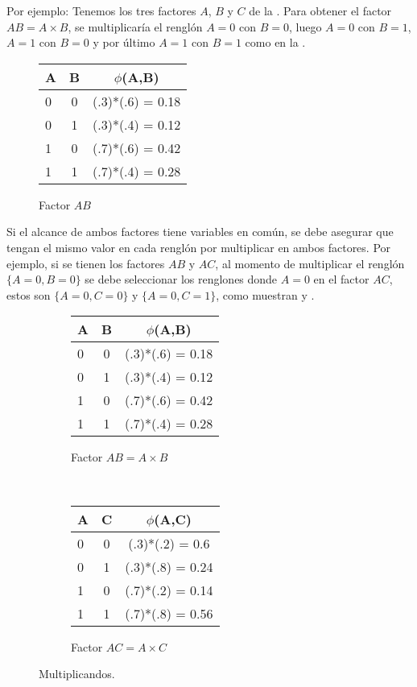 Por ejemplo: Tenemos los tres factores $A$, $B$ y $C$ de la . Para obtener el factor $AB = A \times B$, se multiplicaría el renglón $A=0$ con $B=0$, luego $A=0$ con $B=1$, $A=1$ con $B=0$ y por último $A=1$ con $B=1$ como en la .

\begin{figure}[H]
  \begin{center}
    \begin{tabular}{ l  c | c }
      A & B & $\phi$(A,B)\\ \hline
      0 & 0 & (.3)*(.6) = 0.18 \\ \hline
      0 & 1 & (.3)*(.4) = 0.12 \\ \hline
      1 & 0 & (.7)*(.6) = 0.42 \\ \hline
      1 & 1 & (.7)*(.4) = 0.28 \\
    \end{tabular}
  \end{center}
  \caption{Factor $AB$}
  \label{fig:FactorAxB}
\end{figure}

\noindent Si el alcance de ambos factores tiene variables en común, se debe asegurar que tengan el mismo valor en cada renglón por multiplicar en ambos factores. Por ejemplo, si se tienen los factores $AB$ y $AC$, al momento de multiplicar el renglón $\{A=0,B=0\}$ se debe seleccionar los renglones donde $A=0$ en el factor $AC$, estos son $\{A=0,C=0\}$ y $\{A=0,C=1\}$, como muestran  y .

\begin{figure}[h!]
    \centering
    \begin{subfigure}[b]{0.4\textwidth}
        \centering
        \begin{tabular}{ l  c | c }
          A & B & $\phi$(A,B)\\ \hline
          0 & 0 & (.3)*(.6) = 0.18 \\ \hline
          0 & 1 & (.3)*(.4) = 0.12 \\ \hline
          1 & 0 & (.7)*(.6) = 0.42 \\ \hline
          1 & 1 & (.7)*(.4) = 0.28 \\
        \end{tabular}
        \caption{Factor $AB = A \times B$}
    \end{subfigure}
    ~ 
    \begin{subfigure}[b]{0.4\textwidth}
        \centering
        \begin{tabular}{ l  c | c }
          A & C & $\phi$(A,C)\\ \hline
          0 & 0 & (.3)*(.2) = 0.6 \\ \hline
          0 & 1 & (.3)*(.8) = 0.24 \\ \hline
          1 & 0 & (.7)*(.2) = 0.14 \\ \hline
          1 & 1 & (.7)*(.8) = 0.56 \\
        \end{tabular}
        \caption{Factor $AC = A \times C$}
    \end{subfigure}
    \caption{Multiplicandos.}
    \label{fig:FAFB}
\end{figure}


